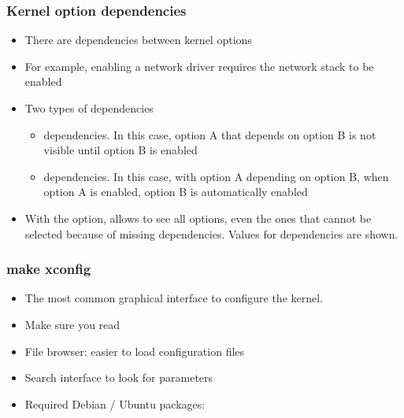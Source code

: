 \begin{frame}
  \frametitle{Kernel option dependencies}
  \begin{itemize}
  \item There are dependencies between kernel options
  \item For example, enabling a network driver requires the network
    stack to be enabled
  \item Two types of dependencies
    \begin{itemize}
    \item {} dependencies. In this case, option A that
      depends on option B is not visible until option B is enabled
    \item {} dependencies. In this case, with option A
      depending on option B, when option A is enabled, option B is
      automatically enabled
    \end{itemize}
  \item With the  option,  allows
    to see all options, even the ones that cannot be selected because of
    missing dependencies. Values for dependencies are shown. 
  \end{itemize}
\end{frame}

\begin{frame}
  \frametitle{make xconfig}
  \begin{itemize}
  \item The most common graphical interface to configure the kernel.
  \item Make sure you read\\
  \item File browser: easier to load configuration files
  \item Search interface to look for parameters
  \item Required Debian / Ubuntu packages: 
  \end{itemize}
\end{frame}

